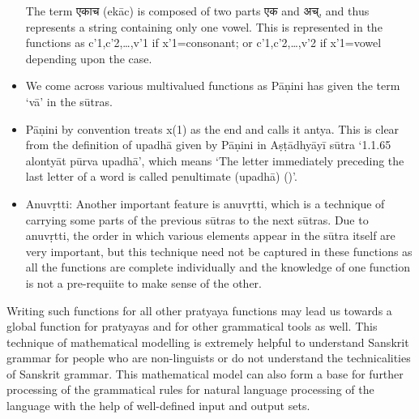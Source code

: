\begin{itemize}
The term \texthindi{एकाच }(ekāc) is composed of two parts \texthindi{एक} and \texthindi{अच्}, and thus represents a string containing only one vowel. This is represented in the functions as c’1,c’2,…,v’1 if x'1=consonant; or c’1,c’2,…,v’2 if x'1=vowel depending upon the case.
\item 	We come across various multivalued functions as Pāṇini has given the term ‘vā’ in the sūtras.
\item 	Pāṇini by convention treats x(1) as the end and calls it antya. This is clear from the definition of upadhā given by Pāṇini in Aṣṭādhyāyī sūtra ‘1.1.65 alontyāt pūrva upadhā’, which means ‘The letter immediately preceding the last letter of a word is called penultimate (upadhā) (\cite{creative})’. 
\item 	Anuvṛtti: Another important feature is anuvṛtti, which is a technique of carrying some parts of the previous sūtras to the next sūtras. Due to anuvṛtti, the order in which various elements appear in the sūtra itself are very important, but this technique need not be captured in these functions as all the functions are complete individually and the knowledge of one function is not a pre-requiite to make sense of the other.
\end{itemize}
Writing such functions for all other pratyaya functions may lead us towards a global function for pratyayas and for other grammatical tools as well. This technique of mathematical modelling is extremely helpful to understand Sanskrit grammar for people who are non-linguists or do not understand the technicalities of Sanskrit grammar. This mathematical model can also form a base for further processing of the grammatical rules for natural language processing of the language with the help of well-defined input and output sets.

